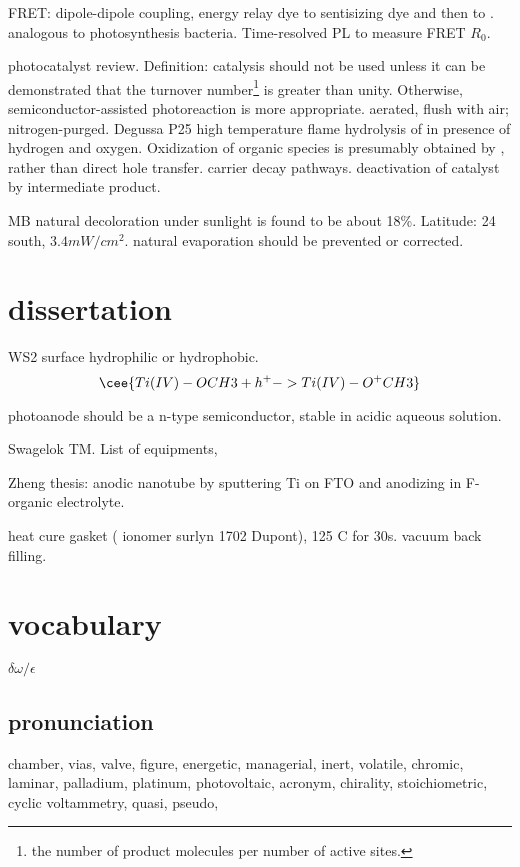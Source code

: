 FRET: dipole-dipole coupling, energy relay dye to sentisizing dye and then to . analogous to photosynthesis bacteria. Time-resolved PL to measure FRET $R_0$.

photocatalyst review.\cite{Mills1997} Definition: catalysis should not be used unless it can be demonstrated that the turnover number\footnote{the number of product molecules per number of active sites.} is greater than unity. Otherwise, semiconductor-assisted photoreaction is more appropriate. aerated, flush with air; nitrogen-purged. Degussa P25  high temperature flame hydrolysis of  in presence of hydrogen and oxygen. Oxidization of organic species is presumably obtained by , rather than direct hole transfer. carrier decay pathways. deactivation of catalyst by intermediate product.

MB natural decoloration under sunlight is found to be about 18\%.\cite{Nogueira1993} Latitude: 24 south, $3.4mW/cm^2$. natural evaporation should be prevented or corrected.

\section{dissertation}

WS2 surface hydrophilic or hydrophobic.
\[
\cee{Ti(IV)-OCH3 + h^+ -> Ti(IV)-O^+CH3}
\]

 photoanode should be a n-type semiconductor, stable in acidic aqueous solution.

Swagelok TM. List of equipments,

Zheng thesis:  anodic nanotube by sputtering Ti on FTO and anodizing in F-organic electrolyte.

heat cure gasket ( ionomer surlyn 1702 Dupont), 125 C for 30s.
vacuum back filling.



\section{vocabulary}
$\delta\omega/\epsilon$ 

\subsection{pronunciation}

chamber, vias, valve, figure, energetic, managerial, inert, volatile, chromic,
laminar, palladium, platinum, photovoltaic, acronym, chirality, stoichiometric, cyclic voltammetry, quasi, pseudo, 

